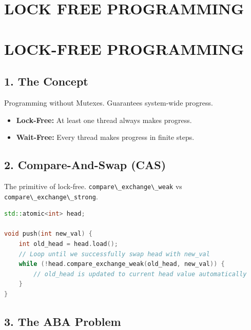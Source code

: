\hypertarget{lock-free-programming}{%
\chapter{LOCK FREE PROGRAMMING}\label{lock-free-programming}}

\hypertarget{lock-free-programming-1}{%
\chapter{LOCK-FREE PROGRAMMING}\label{lock-free-programming-1}}

\hypertarget{the-concept}{%
\section{1. The Concept}\label{the-concept}}

Programming without Mutexes. Guarantees system-wide progress.

\begin{itemize}
\tightlist
\item
  \textbf{Lock-Free:} At least one thread always makes progress.
\item
  \textbf{Wait-Free:} Every thread makes progress in finite steps.
\end{itemize}

\hypertarget{compare-and-swap-cas}{%
\section{2. Compare-And-Swap (CAS)}\label{compare-and-swap-cas}}

The primitive of lock-free.
\passthrough{\lstinline!compare\_exchange\_weak!} vs
\passthrough{\lstinline!compare\_exchange\_strong!}.

\begin{lstlisting}[language={C++}]
std::atomic<int> head;

void push(int new_val) {
    int old_head = head.load();
    // Loop until we successfully swap head with new_val
    while (!head.compare_exchange_weak(old_head, new_val)) {
        // old_head is updated to current head value automatically
    }
}
\end{lstlisting}

\hypertarget{the-aba-problem}{%
\section{3. The ABA Problem}\label{the-aba-problem}}

